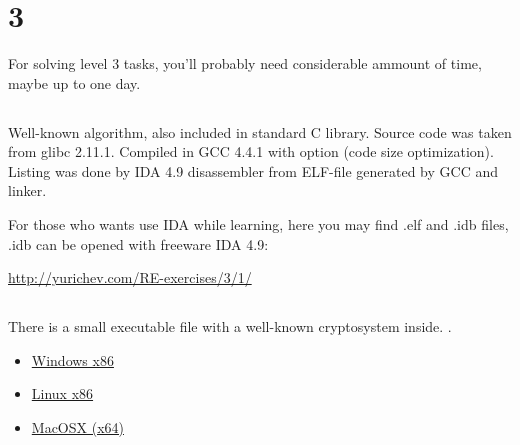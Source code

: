 \chapter{ 3}

{For solving level 3 tasks, you'll probably need considerable ammount of time, maybe up to one day}.

\section{}

{Well-known algorithm, also included in standard C library. Source code was taken from glibc 2.11.1.
Compiled in GCC 4.4.1 with  option (code size optimization).
Listing was done by IDA 4.9 disassembler from ELF-file generated by GCC and linker.}

{For those who wants use IDA while learning, here you may find .elf and .idb files,
.idb can be opened with freeware IDA 4.9:}

\url{http://yurichev.com/RE-exercises/3/1/}



\section{}

{There is a small executable file with a well-known cryptosystem inside}.
.

\begin{itemize}
\item
\href{http://yurichev.com/RE-exercises/3/2/unknown_cryptosystem.exe}{Windows x86}

\item
\href{http://yurichev.com/RE-exercises/3/2/unknown_encryption_linux86.tar}{Linux x86}

\item
\href{http://yurichev.com/RE-exercises/3/2/unknown_encryption_MacOSX.tar}{MacOSX (x64)}
\end{itemize}

